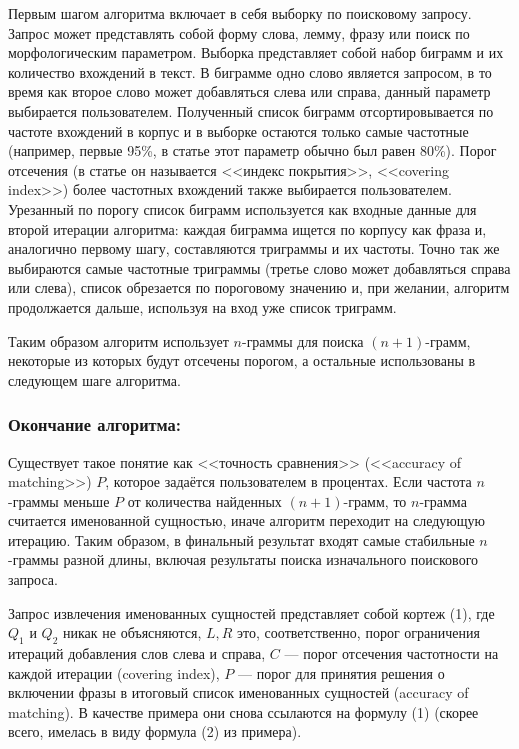Первым шагом алгоритма включает в себя выборку по поисковому запросу. Запрос может 
представлять собой форму слова, лемму, фразу или поиск по морфологическим параметром. 
Выборка представляет собой набор биграмм и их количество вхождений в текст. В биграмме одно 
слово является запросом, в то время как второе слово может добавляться слева или справа, данный 
параметр выбирается пользователем. Полученный список биграмм отсортировывается по частоте 
вхождений в корпус и в выборке остаются только самые частотные (например, первые 95\%, в статье 
этот параметр обычно был равен 80\%). Порог отсечения (в статье он называется <<индекс 
покрытия>>, <<covering index>>) более частотных вхождений также выбирается пользователем. 
Урезанный по порогу список биграмм используется как входные данные для второй итерации 
алгоритма: каждая биграмма ищется по корпусу как фраза и, аналогично первому шагу, 
составляются триграммы и их частоты. Точно так же выбираются самые частотные триграммы 
(третье слово может добавляться справа или слева), список обрезается по пороговому значению и,
при желании, алгоритм продолжается дальше, используя на вход уже список триграмм.

Таким образом алгоритм использует $n$-граммы для поиска $(n+1)$-грамм, некоторые из которых будут отсечены порогом, а остальные использованы в следующем шаге алгоритма.

\subsubsection{Окончание алгоритма:}

Существует такое понятие как <<точность сравнения>> (<<accuracy of matching>>) $P$, которое задаётся пользователем в процентах. Если частота $n$-граммы меньше $P$ от количества найденных $(n+1)$-грамм, то $n$-грамма считается именованной сущностью, иначе алгоритм переходит на следующую итерацию. Таким образом, в финальный результат входят самые стабильные $n$-граммы разной длины, включая результаты поиска изначального поискового запроса.

Запрос извлечения именованных сущностей представляет собой кортеж (1), где $Q_1$ и $Q_2$ никак не объясняются, $L, R$ это, соответственно, порог ограничения итераций добавления слов слева и справа, $C$ --- порог отсечения частотности на каждой итерации (covering index), $P$ --- порог для принятия решения о включении фразы в итоговый список именованных сущностей (accuracy of matching). В качестве примера они снова ссылаются на формулу (1) (скорее всего, имелась в виду формула (2) из примера).


